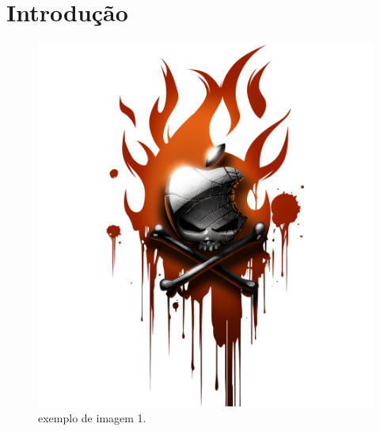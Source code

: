 \chapter{Introdução}\label{cap:intro}

\lipsum[1-3]

\begin{figure}[htbp]
    \begin{center}
    \includegraphics[scale=0.05]{images/imagem01}
    \end{center}
    \caption{exemplo de imagem 1.}
    \label{fig:graficosubscricoesmoveis}
\end{figure}

